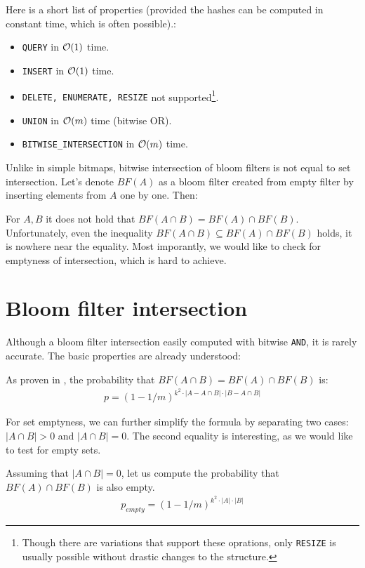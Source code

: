 Here is a short list of properties (provided the hashes can be computed in
constant time, which is often possible).:

\begin{itemize}
	\item {\tt QUERY} in $\mathcal{O}(1)$ time.
	\item {\tt INSERT} in $\mathcal{O}(1)$ time.
	\item {\tt DELETE, ENUMERATE, RESIZE} not supported\footnote{Though there
		are variations that support these oprations, only {\tt RESIZE} is usually
		possible without drastic changes to the structure.}.
	\item {\tt UNION} in $\mathcal{O}(m)$ time (bitwise OR).
	\item {\tt BITWISE\_INTERSECTION} in $\mathcal{O}(m)$ time.
\end{itemize}

Unlike in simple bitmaps, bitwise intersection of bloom filters is not equal to
set intersection.  Let's denote $BF(A)$ as a bloom filter created from empty
filter by inserting elements from $A$ one by one. Then:

For $A,B$ it does not hold that $BF(A \cap B) = BF(A) \cap
BF(B)$. Unfortunately, even the inequality $BF(A \cap B) \subseteq BF(A) \cap
BF(B)$ holds, it is nowhere near the equality. Most imporantly, we would like to
check for emptyness of intersection, which is hard to achieve.

\section{Bloom filter intersection}

Although a bloom filter intersection easily computed with bitwise {\tt AND},
it is rarely accurate. The basic properties are already understood:

As proven in \cite{bose2008false}, the probability that $BF(A\cap B) =
BF(A) \cap BF(B)$ is:
\begin{align}
p = (1-1/m)^{k^2\cdot |A-A\cap B| \cdot |B - A\cap B|}
\end{align}

For set emptyness, we can further simplify the formula by separating two cases:
$|A \cap B| > 0$ and $|A \cap B| = 0$. The second equality is interesting, as
we would like to test for empty sets.

Assuming that $|A\cap B| = 0$, let us compute the probability that $BF(A) \cap
BF(B)$ is also empty.
\begin{align}
	p_{empty} = (1-1/m)^{k^2 \cdot |A| \cdot |B|}
\end{align}

